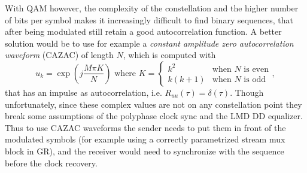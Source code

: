 With QAM however, the complexity of the constellation and the higher number of bits per symbol makes it increasingly difficult to find binary sequences, that after being modulated still retain a good autocorrelation function. A better solution would be to use for example a \emph{constant amplitude zero autocorrelation waveform} (CAZAC) of length \(N\), which is computed with
\begin{equation}
	u_k = \exp\left(j\frac{M\pi K}{N}\right) \text{ where }
	K = \begin{cases}
		k^2 & \text{when } N \text{ is even} \\
		k(k+1) & \text{when } N \text{ is odd}
	\end{cases},
\end{equation}
that has an impulse as autocorrelation\cite{Chu1972}, i.e. \(R_{uu}(\tau) = \delta(\tau)\). Though unfortunately, since these complex values are not on any constellation point they break some assumptions of the polyphase clock sync and the LMD DD equalizer. Thus to use CAZAC waveforms the sender needs to put them in front of the modulated symbols (for example using a correctly parametrized stream mux block in GR), and the receiver would need to synchronize with the sequence before the clock recovery.
